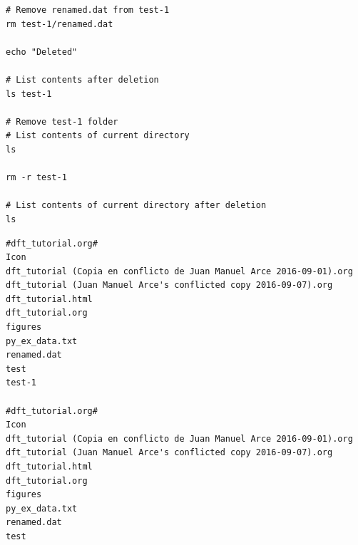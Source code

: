 \documentclass[11pt]{article}
\begin{document}
\begin{enumerate}
\begin{verbatim}
# Remove renamed.dat from test-1
rm test-1/renamed.dat

echo "Deleted"

# List contents after deletion
ls test-1

# Remove test-1 folder
# List contents of current directory
ls

rm -r test-1

# List contents of current directory after deletion
ls
\end{verbatim}

\begin{verbatim}
#dft_tutorial.org#
Icon
dft_tutorial (Copia en conflicto de Juan Manuel Arce 2016-09-01).org
dft_tutorial (Juan Manuel Arce's conflicted copy 2016-09-07).org
dft_tutorial.html
dft_tutorial.org
figures
py_ex_data.txt
renamed.dat
test
test-1

#dft_tutorial.org#
Icon
dft_tutorial (Copia en conflicto de Juan Manuel Arce 2016-09-01).org
dft_tutorial (Juan Manuel Arce's conflicted copy 2016-09-07).org
dft_tutorial.html
dft_tutorial.org
figures
py_ex_data.txt
renamed.dat
test
\end{verbatim}
\end{enumerate}
\end{document}
